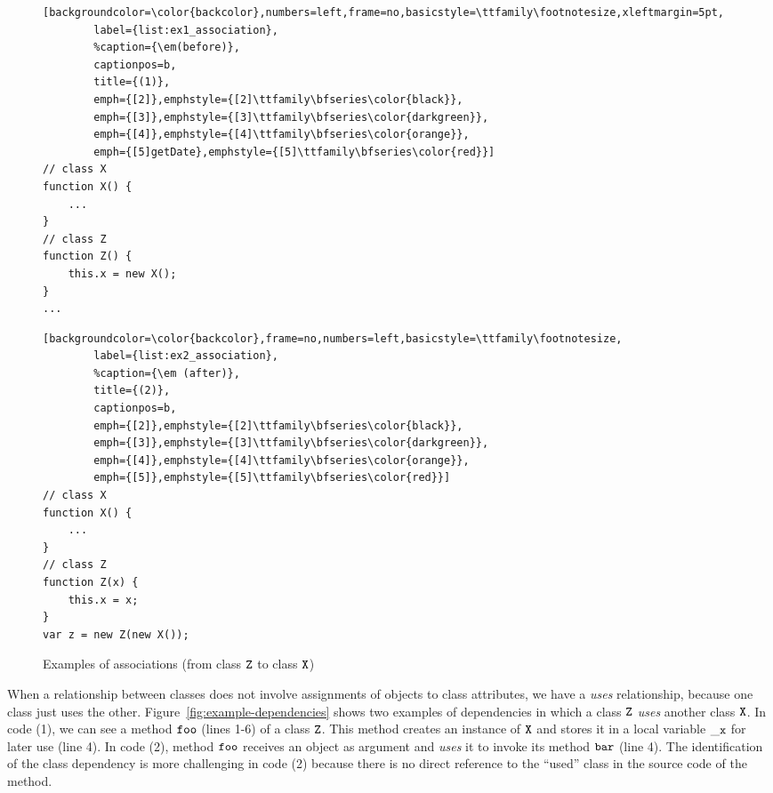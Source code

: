 \documentclass[review]{elsarticle}
\newcommand{\aspas}[1]{{``#1''}}
\newcommand{\mcode}[1]{$\tt #1$}
\begin{document}
\begin{figure}[ht]
	\centering
	\begin{minipage}{.35\textwidth}
		\begin{lstlisting}[backgroundcolor=\color{backcolor},numbers=left,frame=no,basicstyle=\ttfamily\footnotesize,xleftmargin=5pt,
		label={list:ex1_association},
		%caption={\em(before)},
		captionpos=b,
		title={(1)},
		emph={[2]},emphstyle={[2]\ttfamily\bfseries\color{black}},
		emph={[3]},emphstyle={[3]\ttfamily\bfseries\color{darkgreen}},
		emph={[4]},emphstyle={[4]\ttfamily\bfseries\color{orange}},
		emph={[5]getDate},emphstyle={[5]\ttfamily\bfseries\color{red}}]
// class X 
function X() {
	...
}
// class Z 
function Z() {
	this.x = new X();
}
...		
		\end{lstlisting}
	\end{minipage}
	\hspace{1pt}
	\begin{minipage}{.40\textwidth}
		\begin{lstlisting}[backgroundcolor=\color{backcolor},frame=no,numbers=left,basicstyle=\ttfamily\footnotesize,
		label={list:ex2_association},
		%caption={\em (after)},
		title={(2)},
		captionpos=b,
		emph={[2]},emphstyle={[2]\ttfamily\bfseries\color{black}},
		emph={[3]},emphstyle={[3]\ttfamily\bfseries\color{darkgreen}},
		emph={[4]},emphstyle={[4]\ttfamily\bfseries\color{orange}},
		emph={[5]},emphstyle={[5]\ttfamily\bfseries\color{red}}]
// class X 
function X() {
	...
}
// class Z
function Z(x) {
	this.x = x;
}
var z = new Z(new X());
		\end{lstlisting}
	\end{minipage}
	
	\caption{Examples of associations (from class \mcode{Z} to class \mcode{X})}
	\label{fig:example-associations}
\end{figure}

When a relationship between classes does not involve assignments of objects to class attributes, we have a \textit{uses} relationship, because one class just uses the other. Figure~\ref{fig:example-dependencies} shows two examples of dependencies in which a class \mcode{Z} \textit{uses} another class \mcode{X}. In code (1), we can see a method \mcode{foo} (lines 1-6) of a class \mcode{Z}. This method creates an instance of \mcode{X} and stores it in a local variable \mcode{\_x} for later use (line 4). In code (2), method \mcode{foo} receives an object as argument and \textit{uses} it to invoke its method \mcode{bar} (line 4). The identification of the class dependency is more challenging in code (2) because there is no direct reference to the \aspas{used} class in the source code of the method. 
\end{document}
